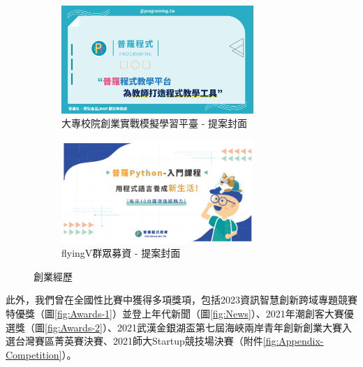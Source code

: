 \begin{figure}[H]
  \centering
  \begin{subfigure}{0.45\linewidth}
    \centering
    \includegraphics[width=0.8\textwidth]{images/maker.png}
    \caption{大專校院創業實戰模擬學習平臺 - 提案封面}
    \label{fig:experience-1}
  \end{subfigure}
    \begin{subfigure}{0.45\linewidth}
    \centering
    \includegraphics[width=0.8\textwidth]{images/flyingv.jpg}
    \caption{flyingV群眾募資 - 提案封面}
    \label{fig:experience-2}
  \end{subfigure}
  \caption{創業經歷}
  \label{fig:Experience}
\end{figure}

此外，我們曾在全國性比賽中獲得多項獎項，包括2023資訊智慧創新跨域專題競賽特優獎（圖\ref{fig:Awards-1}）並登上年代新聞（圖\ref{fig:News}）、2021年潮創客大賽優選獎（圖\ref{fig:Awards-2}）、2021武漢金銀湖盃第七屆海峽兩岸青年創新創業大賽入選台灣賽區菁英賽決賽、2021師大Startup競技場決賽（附件\ref{fig:Appendix-Competition}）。

